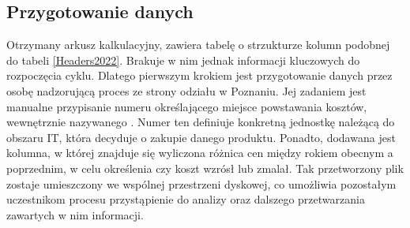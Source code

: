 \subsection{Przygotowanie danych}
Otrzymany arkusz kalkulacyjny, zawiera tabelę o strzukturze kolumn podobnej do tabeli \ref{Headers2022}. Brakuje w nim jednak informacji kluczowych do rozpoczęcia cyklu.
Dlatego pierwszym krokiem jest przygotowanie danych przez osobę nadzorującą proces ze strony odziału w Poznaniu.
Jej zadaniem jest manualne przypisanie numeru określającego miejsce powstawania kosztów, wewnętrznie nazywanego . Numer ten definiuje konkretną jednostkę należącą do obszaru IT, która decyduje o zakupie danego produktu. Ponadto, dodawana jest kolumna, w której znajduje się wyliczona różnica cen między rokiem obecnym a poprzednim, w celu określenia czy koszt wzrósł lub zmalał. Tak przetworzony plik zostaje umieszczony we wspólnej przestrzeni dyskowej, co umożliwia pozostałym uczestnikom procesu przystąpienie do analizy oraz dalszego przetwarzania zawartych w nim informacji.

\renewcommand{\arraystretch}{1.1} %
\begin{table}[H] %
    \begin{adjustwidth}{-50pt}{-20pt}
        \centering
        \caption{Nagłówki kolumn z arkusza kalkulacyjnego z roku 2022}
        \label{Headers2022}
    \end{adjustwidth}
\end{table}

